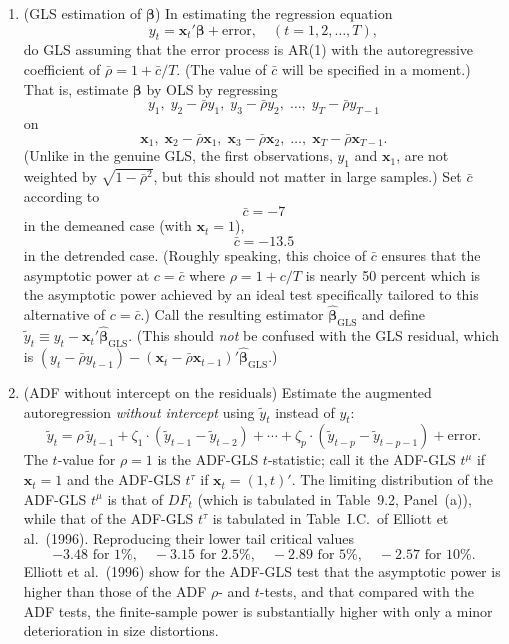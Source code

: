 \begin{problemset}
\begin{enumerate}[label=(\alph*)]
\begin{enumerate}[label=(\roman*)]
\item (GLS estimation of $\bm{\beta}$) \enspace In estimating the regression equation
\[
y_t = \mathbf{x}_t'\bm{\beta} + \text{error}, \quad (t = 1, 2, \ldots, T),
\tag{4}
\]
do GLS assuming that the error process is AR(1) with the autoregressive
coefficient of $\bar{\rho} = 1 + \bar{c}/T$. (The value of $\bar{c}$ will be specified in a moment.)
That is, estimate $\bm{\beta}$ by OLS by regressing
\[
y_1,\; y_2 - \bar{\rho} y_1,\; y_3 - \bar{\rho} y_2,\; \ldots,\; y_T - \bar{\rho} y_{T-1}
\]
on
\[
\mathbf{x}_1,\; \mathbf{x}_2 - \bar{\rho}\mathbf{x}_1,\; \mathbf{x}_3 - \bar{\rho}\mathbf{x}_2,\; \ldots,\; \mathbf{x}_T - \bar{\rho}\mathbf{x}_{T-1}.
\]
(Unlike in the genuine GLS, the first observations, $y_1$ and $\mathbf{x}_1$, are not
weighted by $\sqrt{1 - \bar{\rho}^2}$, but this should not matter in large samples.) Set
$\bar{c}$ according to
\[
\bar{c} = -7
\]
in the demeaned case (with $\mathbf{x}_t = 1$),
\[
\bar{c} = -13.5
\]
in the detrended case. (Roughly speaking, this choice of $\bar{c}$ ensures that the
asymptotic power at $c = \bar{c}$ where $\rho = 1 + c/T$ is nearly 50 percent which
is the asymptotic power achieved by an ideal test specifically tailored to
this alternative of $c = \bar{c}$.) Call the resulting estimator $\hat{\bm{\beta}}_{\text{GLS}}$ and define
$\tilde{y}_t \equiv y_t - \mathbf{x}_t'\hat{\bm{\beta}}_{\text{GLS}}$. (This should \emph{not} be confused with the GLS residual,
which is $(y_t - \bar{\rho}y_{t-1}) - (\mathbf{x}_t - \bar{\rho}\mathbf{x}_{t-1})'\hat{\bm{\beta}}_{\text{GLS}}$.)

\item (ADF without intercept on the residuals) \enspace Estimate the augmented autoregression \emph{without intercept} using $\tilde{y}_t$ instead of $y_t$:
\[
\tilde{y}_t = \rho\,\tilde{y}_{t-1} + \zeta_1 \cdot (\tilde{y}_{t-1} - \tilde{y}_{t-2})
+ \cdots + \zeta_p \cdot (\tilde{y}_{t-p} - \tilde{y}_{t-p-1}) + \text{error}.
\]
The $t$-value for $\rho = 1$ is the ADF-GLS $t$-statistic; call it the ADF-GLS $t^\mu$
if $\mathbf{x}_t = 1$ and the ADF-GLS $t^\tau$ if $\mathbf{x}_t = (1, t)'$. The limiting distribution
of the ADF-GLS $t^\mu$ is that of $DF_t$ (which is tabulated in Table~9.2, Panel~(a)), while that of the ADF-GLS $t^\tau$ is tabulated in Table~I.C.\ of Elliott et al.\
(1996). Reproducing their lower tail critical values
\[
-3.48 \text{ for } 1\%, \quad -3.15 \text{ for } 2.5\%, \quad
-2.89 \text{ for } 5\%, \quad -2.57 \text{ for } 10\%.
\]
Elliott et al.\ (1996) show for the ADF-GLS test that the asymptotic power
is higher than those of the ADF $\rho$- and $t$-tests, and that compared with
the ADF tests, the finite-sample power is substantially higher with only a
minor deterioration in size distortions.
\end{enumerate}


\end{enumerate}
\end{problemset}
